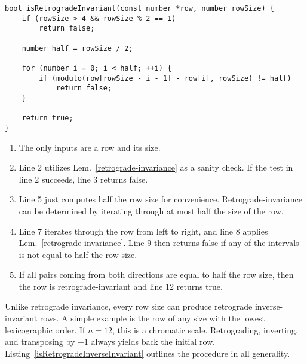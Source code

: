 \begin{lstlisting}[caption={Determining whether a row is retrograde-invariant.},label={isRetrogradeInvariant}]
bool isRetrogradeInvariant(const number *row, number rowSize) {
    if (rowSize > 4 && rowSize % 2 == 1)
        return false;

    number half = rowSize / 2;

    for (number i = 0; i < half; ++i) {
        if (modulo(row[rowSize - i - 1] - row[i], rowSize) != half)
            return false;
    }

    return true;
}
\end{lstlisting}

\begin{enumerate}
\item The only inputs are a row and its size.
\item Line 2 utilizes Lem.~\ref{retrograde-invariance} as a sanity check. If the test in line 2 succeeds, line 3 returns false.
\addtocounter{enumi}{2}
\item Line 5 just computes half the row size for convenience. Retrograde-invariance can be determined by iterating through at most half the size of the row.
\addtocounter{enumi}{1}
\item Line 7 iterates through the row from left to right, and line 8 applies Lem.~\ref{retrograde-invariance}. Line 9 then returns false if any of the intervals is not equal to half the row size.
\addtocounter{enumi}{4}
\item If all pairs coming from both directions are equal to half the row size, then the row is retrograde-invariant and line 12 returns true.
\end{enumerate}

Unlike retrograde invariance, every row size can produce retrograde inverse-invariant rows. A simple example is the row of any size with the lowest lexicographic order. If $n = 12$, this is a chromatic scale. Retrograding, inverting, and transposing by $-1$ always yields back the initial row. Listing~\ref{isRetrogradeInverseInvariant} outlines the procedure in all generality.

